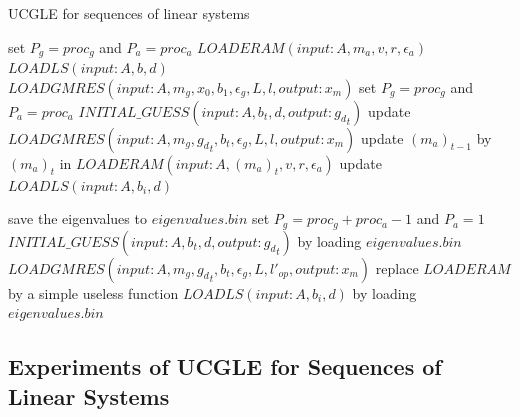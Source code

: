 \begin{algorithm}
	\caption{UCGLE for sequences of linear systems}
	\label{alg:gmres_multi}
	\begin{algorithmic}[1]
		\State set $P_g = proc_g$ and $P_a=proc_a$
		\State $LOADERAM(input: A, m_a, v, r, \epsilon_a)$
		\State $LOADLS(input: A,b, d)$
		\State $LOADGMRES(input: A, m_g, x_0, b_1, \epsilon_g, L, l, output: x_m)$
		\Else
		\State set $P_g = proc_g$ and $P_a=proc_a$
		\State $INITIAL\_GUESS(input: A, b_t, d, output: {g_d}_t)$
		\State update $LOADGMRES(input: A, m_g, {g_d}_t, b_{t}, \epsilon_g, L, l, output: x_m)$
		\State update $(m_a)_{t-1}$ by $(m_a)_{t}$ in $LOADERAM(input: A, (m_a)_{t}, v, r, \epsilon_a)$
		\State update $LOADLS(input: A,b_{i}, d)$
		
		\State save the eigenvalues to $eigenvalues.bin$
		\State set $P_g = proc_g+proc_a - 1$ and $P_a=1$
		\State $INITIAL\_GUESS(input: A, b_t, d, output: {g_d}_t)$ by loading $eigenvalues.bin$
		\State $LOADGMRES(input: A, m_g, {g_d}_t, b_{t}, \epsilon_g, L, l'_{op}, output: x_m)$
		\State replace $LOADERAM$ by a simple useless function
		\State $LOADLS(input: A,b_{i}, d)$ by loading $eigenvalues.bin$
		\EndIf
		\EndIf
		\EndFor
	\end{algorithmic}
\end{algorithm}

\subsection{Experiments of UCGLE for Sequences of Linear Systems}

